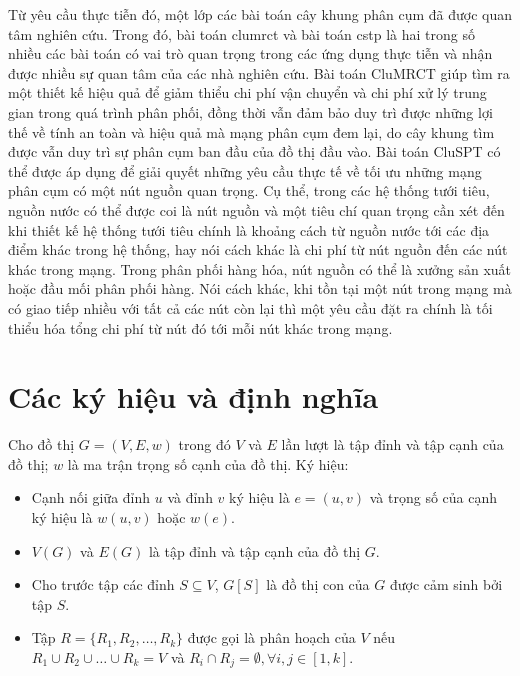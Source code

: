 Từ yêu cầu thực tiễn đó, một lớp các bài toán cây khung phân cụm đã được quan tâm nghiên cứu. Trong đó, bài toán \gls{clumrct} và bài toán \gls{cstp} là hai trong số nhiều các bài toán có vai trò quan trọng trong các ứng dụng thực tiễn và nhận được nhiều sự quan tâm của các nhà nghiên cứu. Bài toán CluMRCT giúp tìm ra một thiết kế hiệu quả để giảm thiểu chi phí vận chuyển và chi phí xử lý trung gian trong quá trình phân phối, đồng thời vẫn đảm bảo duy trì được những lợi thế về tính an toàn và hiệu quả mà mạng phân cụm đem lại, do cây khung tìm được vẫn duy trì sự phân cụm ban đầu của đồ thị đầu vào. Bài toán CluSPT có thể được áp dụng để giải quyết những yêu cầu thực tế về tối ưu những mạng phân cụm có một nút nguồn quan trọng. Cụ thể, trong các hệ thống tưới tiêu, nguồn nước có thể được coi là nút nguồn và một tiêu chí quan trọng cần xét đến khi thiết kế hệ thống tưới tiêu chính là khoảng cách từ nguồn nước tới các địa điểm khác trong hệ thống, hay nói cách khác là chi phí từ nút nguồn đến các nút khác trong mạng. Trong phân phối hàng hóa, nút nguồn có thể là xưởng sản xuất hoặc đầu mối phân phối hàng. Nói cách khác, khi tồn tại một nút trong mạng mà có giao tiếp nhiều với tất cả các nút còn lại thì một yêu cầu đặt ra chính là tối thiểu hóa tổng chi phí từ nút đó tới mỗi nút khác trong mạng. 

\section{Các ký hiệu và định nghĩa} \label{chap_coso:sec:kyHieuVaDinhNghia}
	Cho đồ thị $G=(V, E, w)$ trong đó $V$ và $E$ lần lượt là tập đỉnh và tập cạnh của đồ thị; $w$ là ma trận trọng số cạnh của đồ thị. Ký hiệu:
\begin{itemize}
	\item Cạnh nối giữa đỉnh $u$ và đỉnh $v$ ký hiệu là $e=(u, v)$ và trọng số của cạnh ký hiệu là $w(u, v)$ hoặc $w(e)$.
	\item $V(G)$ và $E(G)$ là tập đỉnh và tập cạnh của đồ thị $G$.
	\item Cho trước tập các đỉnh $S \subseteq V$, $G[S]$  là đồ thị con của $G$ được cảm sinh bởi tập $S$. 
	\item Tập $R=\{R_1, R_2, \ldots,R_k\}$ được gọi là phân hoạch của $V$ nếu $R_1 \cup R_2 \cup \ldots \cup  R_k = V$ và $R_i \cap R_j = \emptyset, \forall i, j \in [1,k]$.
\end{itemize}

